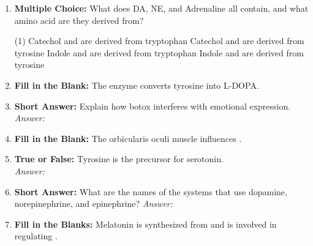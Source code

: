 \begin{enumerate}[label=\textbf{Q3.3.\arabic*}]
    \item \textbf{Multiple Choice:} What does DA, NE, and Adrenaline all contain, and what amino acid are they derived from?
        \begin{tasks}[label=\textcolor{\documentTheme}{(\Alph*)}, item-format=\color{\documentTheme}, label-width=1.5em, item-indent=1.7em](1)
            \task Catechol and are derived from tryptophan
            \task Catechol and are derived from tyrosine
            \task Indole and are derived from tryptophan
            \task Indole and are derived from tyrosine
        \end{tasks}

    \item \textbf{Fill in the Blank:} The enzyme \underline{\hspace{3cm}} converts tyrosine into L-DOPA.

    \item \textbf{Short Answer:} Explain how botox interferes with emotional expression. \\
        \textit{Answer:} \\%

    \item \textbf{Fill in the Blank:} The orbicularis oculi muscle influences \underline{\hspace{3cm}}. 

    \item \textbf{True or False:} Tyrosine is the precursor for serotonin. \\
        \textit{Answer:} %

    \item \textbf{Short Answer:} What are the names of the systems that use dopamine, norepinephrine, and epinephrine?  
        \textit{Answer:} \\ %

    \item \textbf{Fill in the Blanks:} Melatonin is synthesized from \underline{\hspace{3cm}} and is involved in regulating \underline{\hspace{3cm}}.


\end{enumerate}
